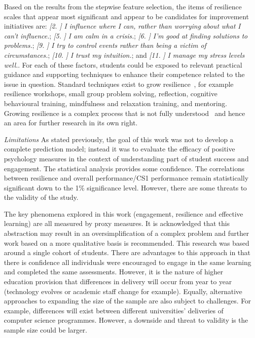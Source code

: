 \documentclass[sigconf]{acmart}
\begin{document}
Based on the results from the stepwise feature selection, the items of resilience scales that appear most significant and appear to be candidates for improvement initiatives are: {\emph{[2. ] I influence where I can, rather than worrying about what I can't influence.}}; {\emph{[5. ] I am calm in a crisis.}}; {\emph{[6. ] I'm good at finding solutions to problems.}}; {\emph{[9. ] I try to control events rather than being a victim of circumstances.}}; {\emph{[10. ] I trust my intuition.}}; and {\emph{[11. ] I manage my stress levels well.}}. For each of these factors, students could be exposed to relevant practical guidance and supporting techniques to enhance their competence related to the issue in question. Standard techniques exist to grow resilience~\cite{Walker2006, Vailes2017, Rodgers2016}, for example resilience workshops, small group problem solving, reflection, cognitive behavioural training, mindfulness and relaxation training, and mentoring. Growing resilience is a complex process that is not fully understood~\cite{Rodgers2016} and hence an area for further research in its own right.

{\em Limitations}
As stated previously, the goal of this work was not to develop a complete prediction model; instead it was to evaluate the efficacy of positive psychology measures in the context of understanding part of student success and engagement. The statistical analysis provides some confidence. The correlations between resilience and overall performance/CS1 performance remain statistically significant down to the 1\% significance level. However, there are some threats to the validity of the study. 

The key phenomena explored in this work (engagement, resilience and effective learning) are all measured by proxy measures. It is acknowledged that this abstraction may result in an oversimplification of a complex problem and further work based on a more qualitative basis is recommended. This research was based around a single cohort of students. There are advantages to this approach in that there is confidence all individuals were encouraged to engage in the same learning and completed the same assessments. However, it is the nature of higher education provision that differences in delivery will occur from year to year (technology evolves or academic staff change for example). Equally, alternative approaches to expanding the size of the sample are also subject to challenges. For example, differences will exist between different universities' deliveries of computer science programmes. However, a downside and threat to validity is the sample size could be larger. 
\end{document}
